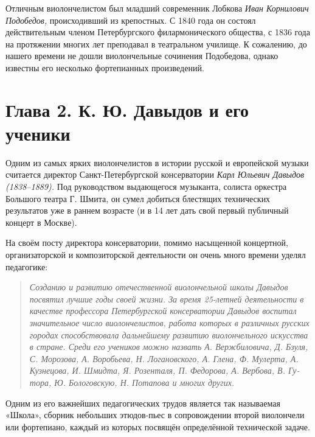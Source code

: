 \documentclass[12pt,a4paper,oneside,titlepage,draft]{extreport}
\begin{document}
Отличным виолончелистом был младший современник Лобкова \emph{Иван Корнилович Подобедов,} происходивший из крепостных.
С 1840 года он состоял действительным членом Петербургского филармонического общества, с 1836 года на протяжении многих лет преподавал в театральном училище. К сожалению, до нашего времени не дошли виолончельные сочинения
Подобедова, однако известны его несколько фортепианных произведений.
		


	
	\section*{Глава 2. К. Ю. Давыдов и его ученики}
				

		Одним из самых ярких виолончелистов в истории русской и европейской музыки считается директор Санкт-Петербургской консерватории \emph{Карл Юльевич Давыдов (1838--1889).} Под руководством выдающегося музыканта, солиста оркестра Большого театра Г. Шмита, он сумел добиться блестящих технических результатов уже в раннем возрасте (и в 14 лет дать свой первый публичный концерт в Москве). 
		
		На своём посту директора консерватории, помимо насыщенной концертной, организаторской и композиторской деятельности он очень много времени уделял педагогике:
		
		\begin{quotation}
		\textit{Созданию и развитию отечественной виолончельной 
школы Давыдов посвятил лучшие годы своей жизни. За время
25-летней деятельности в качестве профессора 
Петербургской консерватории Давыдов воспитал значительное число
виолончелистов, работа которых в различных русских 
городах способствовала дальнейшему развитию виолончельного
искусства в стране. Среди его учеников можно назвать
А. Вержбиловича, Д. Бзуля, С. Морозова, А. Воробьева,
Н. Логановского, А. Глена, Ф. Мулерта, А. Кузнецова,
И. Шмидта, Я. Розенталя, П. Федорова, А. Вербова, В. Гу-
тора, Ю. Бологовскую, Н. Потапова и многих других.}
		\end{quotation}
		
		Одним из его важнейших педагогических трудов является так называемая «Школа», сборник небольших этюдов-пьес в сопровождении второй виолончели или фортепиано, каждый из которых посвящён определённой технической задаче.
		
\end{document}

